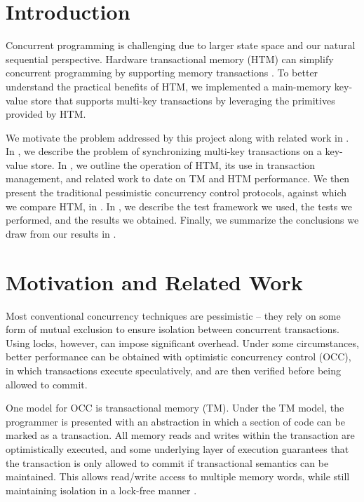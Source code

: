 \section{Introduction} \label{sec:intro}


Concurrent programming is challenging due to larger state space and our natural  
sequential perspective. Hardware transactional memory (HTM) can  
simplify concurrent programming by supporting memory transactions \citep{tm}. 
To better understand the practical benefits of HTM, we implemented a main-memory 
key-value store that supports multi-key transactions by leveraging the 
primitives provided by HTM. 

We motivate the problem addressed by this project along with related work in
.
In , we describe the problem of synchronizing multi-key
transactions on a key-value store. In , we outline the operation of
HTM, its use in transaction management, and related work to date on TM and HTM
performance. We then present the traditional pessimistic concurrency control
protocols, against which we compare HTM, in  . In
, we describe the test framework we used, the tests we performed,
and the results we obtained. Finally, we summarize the conclusions we draw from
our results in .

\section{Motivation and Related Work} \label{sec:related}

Most conventional concurrency techniques are pessimistic -- they rely on some
form of mutual exclusion to ensure isolation between concurrent
transactions. Using locks, however, can impose significant overhead. Under some
circumstances, better performance can be obtained with optimistic concurrency
control (OCC), in which transactions execute speculatively, and are then
verified before being allowed to commit.

One model for OCC is transactional memory (TM). Under the TM model, the
programmer is presented with an abstraction in which a section of code can be
marked as a transaction. All memory reads and writes within the transaction are
optimistically executed, and some underlying layer of execution guarantees that
the transaction is only allowed to commit if transactional semantics can be
maintained. This allows read/write access to multiple memory words, while still
maintaining isolation in a lock-free manner \citep{Herlihy93}.

